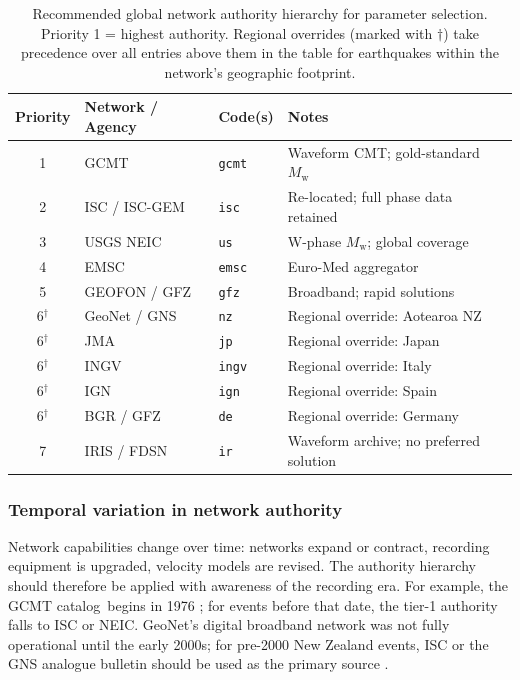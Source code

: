 \documentclass[12pt]{article}
\newcommand{\catalog}{catalog}
\begin{document}
\begin{table}[H]
  \centering
  \caption{Recommended global network authority hierarchy for parameter
           selection.  Priority 1 = highest authority.  Regional overrides
           (marked with $\dagger$) take precedence over all entries above them
           in the table for earthquakes within the network's geographic
           footprint.}
  \label{tab:hierarchy}
  \begin{tabular}{cllp{4.5cm}}
    \toprule
    Priority & Network / Agency & Code(s) & Notes \\
    \midrule
    1 & GCMT & \texttt{gcmt} & Waveform CMT; gold-standard $M_\mathrm{w}$ \\
    2 & ISC / ISC-GEM & \texttt{isc} & Re-located; full phase data retained \\
    3 & USGS NEIC & \texttt{us} & W-phase $M_\mathrm{w}$; global coverage \\
    4 & EMSC & \texttt{emsc} & Euro-Med aggregator \\
    5 & GEOFON / GFZ & \texttt{gfz} & Broadband; rapid solutions \\
    6$^\dagger$ & GeoNet / GNS & \texttt{nz} & Regional override: Aotearoa NZ \\
    6$^\dagger$ & JMA & \texttt{jp} & Regional override: Japan \\
    6$^\dagger$ & INGV & \texttt{ingv} & Regional override: Italy \\
    6$^\dagger$ & IGN & \texttt{ign} & Regional override: Spain \\
    6$^\dagger$ & BGR / GFZ & \texttt{de} & Regional override: Germany \\
    7 & IRIS / FDSN & \texttt{ir} & Waveform archive; no preferred solution \\
    \bottomrule
  \end{tabular}
\end{table}

\subsubsection{Temporal variation in network authority}

Network capabilities change over time: networks expand or contract, recording
equipment is upgraded, velocity models are revised.  The authority hierarchy
should therefore be applied with awareness of the recording era.  For example,
the GCMT \catalog\ begins in 1976 \citep{Dziewonski1981}; for events before
that date, the tier-1 authority falls to ISC or NEIC.  GeoNet's digital
broadband network was not fully operational until the early 2000s; for
pre-2000 New Zealand events, ISC or the GNS analogue bulletin should be used
as the primary source \citep{GeoNetEqCatalogue}.
\end{document}
